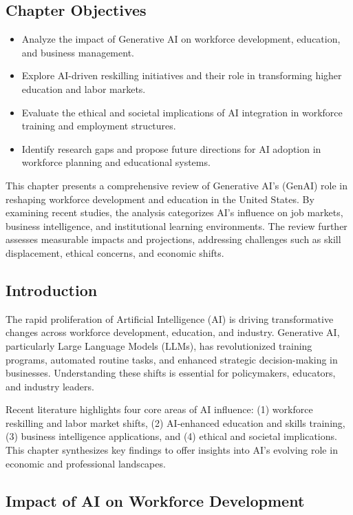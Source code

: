 \documentclass[a4paper,headinclude=on,footinclude=on,12pt,oneside]{scrbook}
\begin{document}
\subsection*{Chapter Objectives}
\begin{itemize}
	\item Analyze the impact of Generative AI on workforce development, education, and business management.
	\item Explore AI-driven reskilling initiatives and their role in transforming higher education and labor markets.
	\item Evaluate the ethical and societal implications of AI integration in workforce training and employment structures.
	\item Identify research gaps and propose future directions for AI adoption in workforce planning and educational systems.
\end{itemize}

This chapter presents a comprehensive review of Generative AI's (GenAI) role in reshaping workforce development and education in the United States. By examining recent studies, the analysis categorizes AI's influence on job markets, business intelligence, and institutional learning environments. The review further assesses measurable impacts and projections, addressing challenges such as skill displacement, ethical concerns, and economic shifts.

\subsection*{Introduction}

The rapid proliferation of Artificial Intelligence (AI) is driving transformative changes across workforce development, education, and industry. Generative AI, particularly Large Language Models (LLMs), has revolutionized training programs, automated routine tasks, and enhanced strategic decision-making in businesses. Understanding these shifts is essential for policymakers, educators, and industry leaders.

Recent literature highlights four core areas of AI influence: (1) workforce reskilling and labor market shifts, (2) AI-enhanced education and skills training, (3) business intelligence applications, and (4) ethical and societal implications. This chapter synthesizes key findings to offer insights into AI’s evolving role in economic and professional landscapes.

\subsection*{Impact of AI on Workforce Development}
\end{document}
